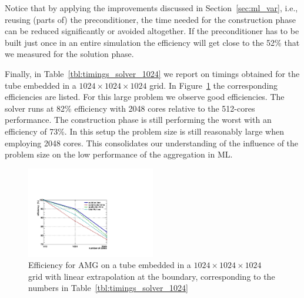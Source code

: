 \documentclass[a4paper,10pt,3p,preprint,pdftex]{elsarticle}
\begin{document}
Notice that by applying the improvements discussed in
Section~\ref{sec:ml_var}, i.e., reusing (parts of) the preconditioner,
the time needed for the construction phase can be reduced significantly
or avoided altogether.  If the preconditioner has to be built just once
in an entire simulation the efficiency will get close to the 52\% that
we measured for the solution phase.  


Finally, in Table~\ref{tbl:timings_solver_1024} we report on timings
obtained for the tube embedded in a $1024\times1024\times1024$ grid.  In
Figure~\ref{fig:speedup_1024} the corresponding efficiencies are listed.
For this large problem we observe good efficiencies.  The solver runs at
82\% efficiency with 2048 cores relative to the 512-cores performance.
The construction phase is still performing the worst with an efficiency
of 73\%.  In this setup the problem size is still reasonably large when
employing 2048 cores.  This consolidates our understanding of the
influence of the problem size on the low performance of the aggregation
in ML.

\begin{figure}[htb] 
  \begin{center}
    \includegraphics[width=0.5\textwidth]{eff_1024_lin.pdf}
    \caption{Efficiency for AMG on a tube embedded in a
      $1024\times1024\times1024$ grid with linear extrapolation at the
      boundary, corresponding to the numbers in
      Table~\ref{tbl:timings_solver_1024}}
    \label{fig:speedup_1024}
  \end{center} 
\end{figure}
\end{document}
